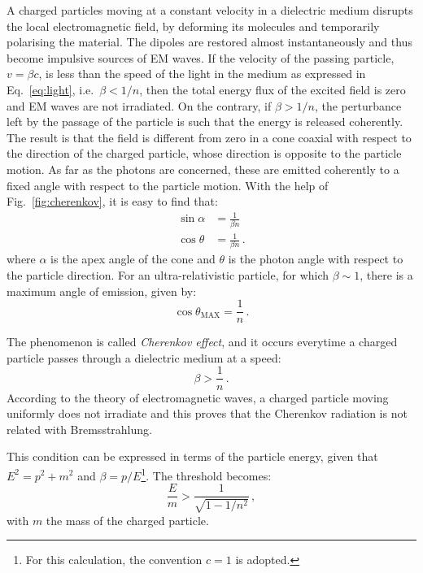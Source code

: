  A charged particles moving at a constant velocity in a dielectric medium disrupts the local electromagnetic field, %
 by deforming its molecules and temporarily polarising the material.
 The dipoles are restored almost instantaneously and thus become impulsive sources of EM waves.
 If the velocity of the passing particle, $v = \beta c$, is less than the speed of the light in the medium %
 as expressed in Eq.~\ref{eq:light}, i.e.\ $\beta < 1/n$, then the total energy flux of the excited %
 field is zero and EM waves are not irradiated.
 On the contrary, if $\beta > 1/n$, the perturbance left by the passage of the particle is such that %
 the energy is released coherently.
 The result is that the field is different from zero in a cone coaxial with respect to the direction of %
 the charged particle, whose direction is opposite to the particle motion.
 As far as the photons are concerned, these are emitted coherently to a fixed angle with respect %
 to the particle motion.
 With the help of Fig.~\ref{fig:cherenkov}, it is easy to find that:
 \begin{align}
   \sin \alpha &= \frac{1}{\beta n}\,\\
   \cos \theta &= \frac{1}{\beta n}\,.
 \end{align}
 where $\alpha$ is the apex angle of the cone and $\theta$ is the photon angle with respect to the particle direction.
 For an ultra-relativistic particle, for which $\beta \sim 1$, there is a maximum angle of emission, given by:
 \begin{equation}
   \cos \theta_{\mathrm{MAX}} = \frac{1}{n}\,.
 \end{equation}

 The phenomenon is called \emph{Cherenkov effect}, and it occurs everytime a charged particle passes through a %
 dielectric medium at a speed:
 \begin{equation}
   \label{eq:cherenkov}
   \beta > \frac{1}{n}\,.
 \end{equation}
 According to the theory of electromagnetic waves, a charged particle moving uniformly does not irradiate %
 and this proves that the Cherenkov radiation is not related with Bremsstrahlung. 

 This condition can be expressed in terms of the particle energy, given that $E^2 = p^2+m^2$ and %
 $\beta = p/E$\footnote{For this calculation, the convention $c = 1$ is adopted.}.
 The threshold becomes:
 \begin{equation}
   \label{eq:ch_Eth}
   \frac{E}{m} > \frac{1}{\sqrt{1-1/n^2}}\,,
 \end{equation}
 with $m$ the mass of the charged particle.

